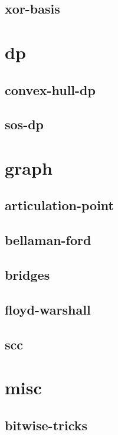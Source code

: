 \documentclass[a4paper, twocolumn]{article}
\begin{document}
\subsection{xor-basis}

\section{dp}
\subsection{convex-hull-dp}

\subsection{sos-dp}

\section{graph}
\subsection{articulation-point}

\subsection{bellaman-ford}

\subsection{bridges}

\subsection{floyd-warshall}

\subsection{scc}

\section{misc}
\subsection{bitwise-tricks}

\end{document}
